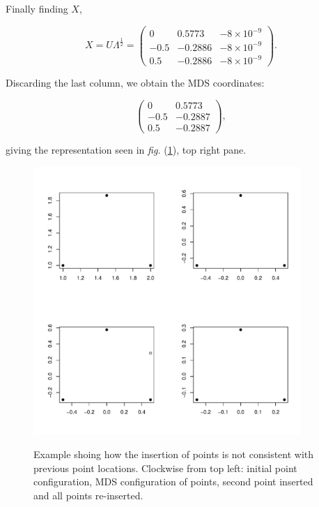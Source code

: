\documentclass[a4paper,10pt]{amsart}
\newcommand{\fig}[1]{\emph{fig.} (\ref{#1})}
\newcommand{\cross}{\times}
\begin{document}
Finally finding $X$,

\begin{equation*}
X=U\Lambda^{\frac{1}{2}}= \begin{pmatrix} 
	0 & 0.5773 & -8\cross10^{-9}\\
	-0.5 & -0.2886 & -8\cross10^{-9}\\ 
	0.5 & -0.2886 & -8\cross10^{-9}
	\end{pmatrix}.
\end{equation*}

Discarding the last column, we obtain the MDS coordinates:

\begin{equation}
\begin{pmatrix} 
	0 & 0.5773\\
	-0.5 & -0.2887\\ 
	0.5 & -0.2887
	\end{pmatrix},
\label{origMDScoords}
\end{equation}

giving the representation seen in \fig{cexample}, top right pane.

\begin{figure}
\centering
\includegraphics[width=4in]{figs/cexample-fig.pdf} \\
\caption{Example shoing how the insertion of points is not consistent with previous point locations. Clockwise from top left: initial point configuration, MDS configuration of points, second point inserted and all points re-inserted.}
\label{cexample}
\end{figure}
\end{document}
